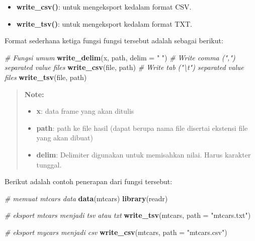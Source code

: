 \documentclass[]{book}
\newenvironment{Shaded}{\begin{snugshade}}{\end{snugshade}}
\newcommand{\KeywordTok}[1]{\textcolor[rgb]{0.13,0.29,0.53}{\textbf{#1}}}
\newcommand{\DataTypeTok}[1]{\textcolor[rgb]{0.13,0.29,0.53}{#1}}
\newcommand{\StringTok}[1]{\textcolor[rgb]{0.31,0.60,0.02}{#1}}
\newcommand{\CommentTok}[1]{\textcolor[rgb]{0.56,0.35,0.01}{\textit{#1}}}
\newcommand{\NormalTok}[1]{#1}
\providecommand{\tightlist}{%
  \setlength{\itemsep}{0pt}\setlength{\parskip}{0pt}}
\begin{document}
\begin{itemize}
\tightlist
\item
  \textbf{write\_csv()}: untuk mengeksport kedalam format CSV.
\item
  \textbf{write\_tsv()}: untuk mengeksport kedalam format TXT.
\end{itemize}

Format sederhana ketiga fungsi fungsi tersebut adalah sebagai berikut:

\begin{Shaded}
\begin{Highlighting}[]
\CommentTok{# Fungsi umum}
\KeywordTok{write_delim}\NormalTok{(x, path, }\DataTypeTok{delim =} \StringTok{" "}\NormalTok{)}
\CommentTok{# Write comma (",") separated value files}
\KeywordTok{write_csv}\NormalTok{(file, path)}
\CommentTok{# Write tab ("\textbackslash{}t") separated value files}
\KeywordTok{write_tsv}\NormalTok{(file, path)}
\end{Highlighting}
\end{Shaded}

\begin{quote}
\textbf{Note: }

\begin{itemize}
\tightlist
\item
  \textbf{x}: data frame yang akan ditulis
\item
  \textbf{path}: path ke file hasil (dapat berupa nama file disertai
  ekstensi file yang akan dibuat)
\item
  \textbf{delim}: Delimiter digunakan untuk memisahkan nilai. Harus
  karakter tunggal.
\end{itemize}
\end{quote}

Berikut adalah contoh penerapan dari fungsi tersebut:

\begin{Shaded}
\begin{Highlighting}[]
\CommentTok{# memuat mtcars data}
\KeywordTok{data}\NormalTok{(mtcars)}
\KeywordTok{library}\NormalTok{(readr)}

\CommentTok{# eksport mtcars menjadi tsv atau txt}
\KeywordTok{write_tsv}\NormalTok{(mtcars, }\DataTypeTok{path =} \StringTok{"mtcars.txt"}\NormalTok{)}

\CommentTok{# eksport mycars menjadi csv}
\KeywordTok{write_csv}\NormalTok{(mtcars, }\DataTypeTok{path =} \StringTok{"mtcars.csv"}\NormalTok{)}
\end{Highlighting}
\end{Shaded}
\end{document}
